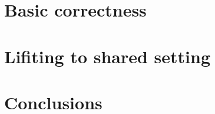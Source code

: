 \documentclass[a4paper]{article}
\begin{document}
    \section{Basic correctness}
    \label{sec:basic}

    \section{Lifiting to shared setting}
    \label{sec:lifiting}

           

    \section{Conclusions}
    \label{sec:conclusions}





\end{document}
